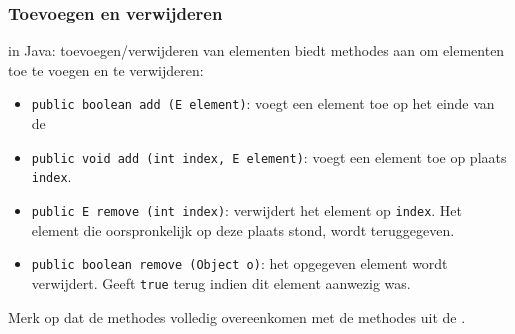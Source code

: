 \subsubsection{Toevoegen en verwijderen}
\begin{frame}[fragile]{\dslinkedlist{} in Java: toevoegen/verwijderen van elementen}
\dslinkedlist{} biedt methodes aan om elementen toe te voegen en te verwijderen:
\small{\begin{itemize}
 \item \texttt{public boolean add (E element)}: voegt een element toe op het einde van de \dslinkedlist{}
 \item \texttt{public void add (int index, E element)}: voegt een element toe op plaats \texttt{index}.%
 \item \texttt{public E remove (int index)}: verwijdert het element op \texttt{index}. Het element die oorspronkelijk op deze plaats stond, wordt teruggegeven.%
 \item \texttt{public boolean remove (Object o)}: het opgegeven element wordt verwijdert. Geeft \texttt{true} terug indien dit element aanwezig was.
\end{itemize}}
\begin{letop}
Merk op dat de methodes volledig overeenkomen met de methodes uit de \dsarraylist{}.
\end{letop}
\end{frame}

